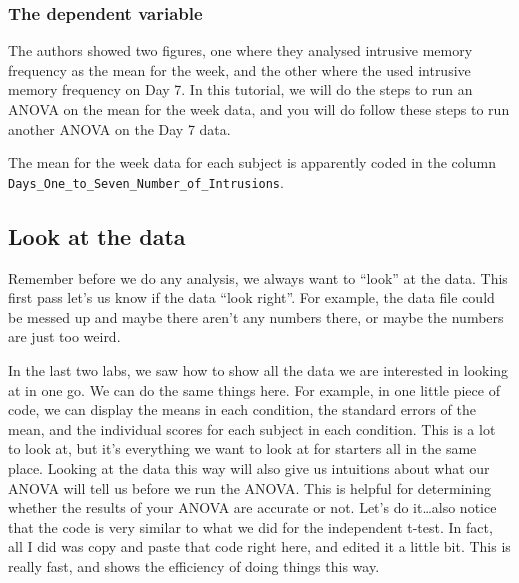 \documentclass[
]{book}
\begin{document}
\hypertarget{the-dependent-variable}{%
\subsubsection{The dependent variable}\label{the-dependent-variable}}

The authors showed two figures, one where they analysed intrusive memory frequency as the mean for the week, and the other where the used intrusive memory frequency on Day 7. In this tutorial, we will do the steps to run an ANOVA on the mean for the week data, and you will do follow these steps to run another ANOVA on the Day 7 data.

The mean for the week data for each subject is apparently coded in the column \texttt{Days\_One\_to\_Seven\_Number\_of\_Intrusions}.

\hypertarget{look-at-the-data-2}{%
\subsection{Look at the data}\label{look-at-the-data-2}}

Remember before we do any analysis, we always want to ``look'' at the data. This first pass let's us know if the data ``look right''. For example, the data file could be messed up and maybe there aren't any numbers there, or maybe the numbers are just too weird.

In the last two labs, we saw how to show all the data we are interested in looking at in one go. We can do the same things here. For example, in one little piece of code, we can display the means in each condition, the standard errors of the mean, and the individual scores for each subject in each condition. This is a lot to look at, but it's everything we want to look at for starters all in the same place. Looking at the data this way will also give us intuitions about what our ANOVA will tell us before we run the ANOVA. This is helpful for determining whether the results of your ANOVA are accurate or not. Let's do it\ldots also notice that the code is very similar to what we did for the independent t-test. In fact, all I did was copy and paste that code right here, and edited it a little bit. This is really fast, and shows the efficiency of doing things this way.
\end{document}
